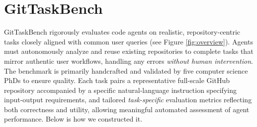 \documentclass[letterpaper]{article} %
\begin{document}
\section{GitTaskBench}


GitTaskBench rigorously evaluates code agents on realistic, repository-centric tasks closely aligned with common user queries (see Figure \ref{fig:overview}). Agents must autonomously analyze and reuse existing repositories to complete tasks that mirror authentic user workflows, handling any errors \textit{without human intervention}.
The benchmark is primarily handcrafted and validated by five computer science PhDs to ensure quality. 
%
Each task pairs a representative full-scale GitHub repository accompanied by a specific natural-language instruction specifying input-output requirements, and tailored \textit{task-specific} evaluation metrics reflecting both correctness and utility, allowing meaningful automated assessment of agent performance. 
%
Below is how we constructed it.
\end{document}
